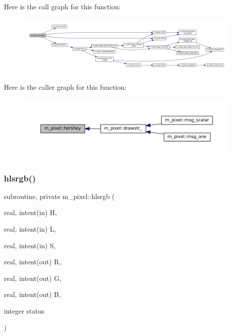 Here is the call graph for this function\+:
\nopagebreak
\begin{figure}[H]
\begin{center}
\leavevmode
\includegraphics[width=350pt]{namespacem__pixel_a80dc3cb149287470a9837de8dd3f05bc_cgraph}
\end{center}
\end{figure}
Here is the caller graph for this function\+:
\nopagebreak
\begin{figure}[H]
\begin{center}
\leavevmode
\includegraphics[width=350pt]{namespacem__pixel_a80dc3cb149287470a9837de8dd3f05bc_icgraph}
\end{center}
\end{figure}
\mbox{\label{namespacem__pixel_a854b4980c2694d7c33b2830a225eeca0}} 
\subsubsection{\texorpdfstring{hlsrgb()}{hlsrgb()}}
{\footnotesize\ttfamily subroutine, private m\+\_\+pixel\+::hlsrgb (\begin{DoxyParamCaption}\item[{real, intent(in)}]{H,  }\item[{real, intent(in)}]{L,  }\item[{real, intent(in)}]{S,  }\item[{real, intent(out)}]{R,  }\item[{real, intent(out)}]{G,  }\item[{real, intent(out)}]{B,  }\item[{integer}]{status }\end{DoxyParamCaption})\hspace{0.3cm}{\ttfamily [private]}}



